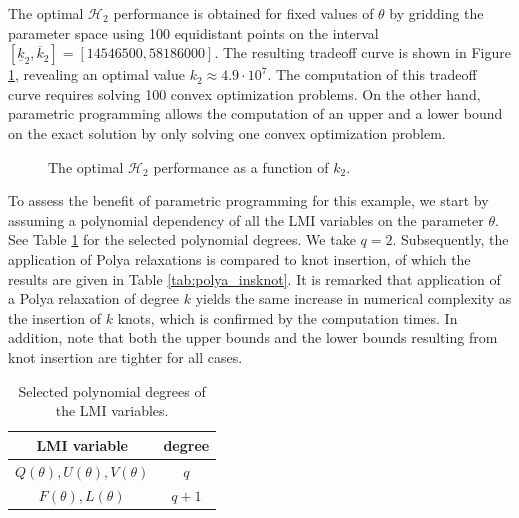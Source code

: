 \documentclass{article}
\newcommand{\ppar}{\theta}                  %
\newcommand{\Htwo}{\mathcal{H}_2}
\begin{document}
The optimal $\Htwo$ performance is obtained for fixed values of $\ppar$ by gridding the parameter space using 100 equidistant points on the interval $[ \underline{k}_2,\overline{k}_2] = [14546500,58186000]$. The resulting tradeoff curve is shown in Figure \ref{fig:sampled}, revealing an optimal value $k_2 \approx 4.9 \cdot 10^7$. The computation of this tradeoff curve requires solving 100 convex optimization problems. On the other hand, parametric programming allows the computation of an upper and a lower bound on the exact solution by only solving one convex optimization problem.

\begin{figure}
\centering

\caption{The optimal $\Htwo$ performance as a function of $k_2$.}
\label{fig:sampled}
\end{figure}

To assess the benefit of parametric programming for this example, we start by assuming a polynomial dependency of all the LMI variables on the parameter $\ppar$. See Table \ref{tab:degrees} for the selected polynomial degrees. We take $q = 2$. Subsequently, the application of Polya relaxations is compared to knot insertion, of which the results are given in Table \ref{tab:polya_insknot}. It is remarked that application of a Polya relaxation of degree $k$ yields the same increase in numerical complexity as the insertion of $k$ knots, which is confirmed by the computation times. In addition, note that both the upper bounds and the lower bounds resulting from knot insertion are tighter for all cases.

\begin{table}
	\centering
	\caption{Selected polynomial degrees of the LMI variables.} \vspace{0.2cm}
	\label{tab:degrees}
	\begin{tabular}{cc}
		\toprule
	  LMI variable & degree \\
	  \midrule
		$Q(\ppar),U(\ppar),V(\ppar)$ & $q$ \\
		$F(\ppar), L(\ppar)$ & $q+1$ \\
		\bottomrule
	\end{tabular}
\end{table}
\end{document}
